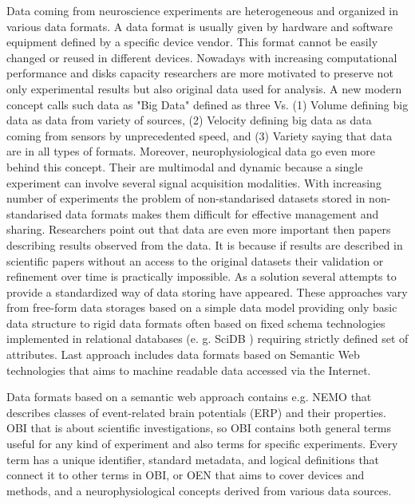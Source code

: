 \documentclass[utf8]{frontiersSCNS} %
\begin{document}
Data coming from neuroscience experiments are heterogeneous and organized in various data formats. A data format is usually given by hardware and software equipment defined by a specific device vendor. This format cannot be easily changed or reused in different devices. Nowadays with increasing computational performance and disks capacity researchers are more  motivated to preserve not only experimental results but also original data used for analysis. A new modern concept calls such data as "Big Data" defined as  three Vs. (1) Volume defining big data as data from variety of sources, (2) Velocity defining big data as data coming from sensors by unprecedented speed, and	(3) Variety saying that data are in all types of formats. Moreover, neurophysiological data go even more behind this concept. Their are multimodal and dynamic because a single experiment can involve several signal acquisition modalities. With increasing number of experiments the problem of non-standarised datasets stored in non-standarised data formats makes  them difficult for effective management and sharing. Researchers point out that data are even more important then papers describing results observed from the data. It is because if results are described in scientific papers without an access to the original datasets their validation or refinement over time is practically impossible. As a solution several attempts to provide a standardized way of data storing have appeared. These approaches vary from free-form data storages based on a simple data model providing only basic data structure \citep{10.3389/fninf.2011.00016} to rigid data formats often based on fixed schema technologies implemented in relational databases (e. g. SciDB \citep{Brown:2010:OSL:1807167.1807271}) requiring strictly defined set of attributes. Last approach includes data formats based on Semantic Web technologies that aims to machine readable data accessed via the Internet. 

Data formats based on a semantic web approach contains e.g.  NEMO \citep{DouFRFMT07} that describes classes of event-related brain potentials (ERP) and their properties. OBI \citep{citeulike:7291351} that is about scientific investigations, so OBI contains both general terms useful for any kind of experiment and also terms for specific experiments. Every term has a unique identifier, standard metadata, and logical definitions that connect it to other terms in OBI, or OEN  \citep{10.3389/conf.fninf.2014.18.00044} that aims to cover devices and methods, and a  neurophysiological concepts derived from various data sources.
\end{document}
